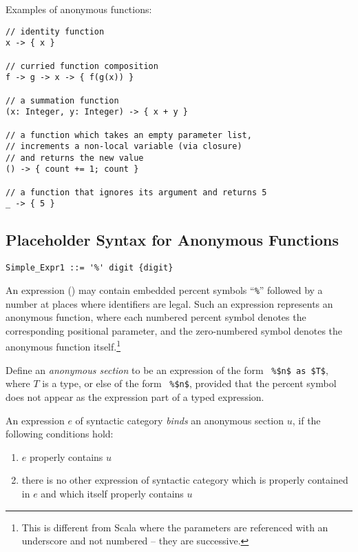 \example Examples of anonymous functions:
\begin{lstlisting}
// identity function
x -> { x }

// curried function composition
f -> g -> x -> { f(g(x)) }

// a summation function
(x: Integer, y: Integer) -> { x + y }

// a function which takes an empty parameter list,
// increments a non-local variable (via closure)
// and returns the new value
() -> { count += 1; count }

// a function that ignores its argument and returns 5
_ -> { 5 }
\end{lstlisting}





\subsection{Placeholder Syntax for Anonymous Functions}
\label{sec:placeholder-functions}

\syntax\begin{lstlisting}
Simple_Expr1 ::= '%' digit {digit}
\end{lstlisting}

An expression () may contain embedded percent symbols ``\lstinline!%!'' followed by a number at places where identifiers are legal. Such an expression represents an anonymous function, where each numbered percent symbol denotes the corresponding positional parameter, and the zero-numbered symbol denotes the anonymous function itself.\footnote{This is different from Scala where the parameters are referenced with an underscore and not numbered -- they are successive.}

Define an {\em anonymous section} to be an expression of the form ~\lstinline!%$n$ as $T$!, where $T$ is a type, or else of the form ~\lstinline!%$n$!, provided that the percent symbol does not appear as the expression part of a typed expression. 

An expression $e$ of syntactic category  {\em binds} an anonymous section $u$, if the following conditions hold:
\begin{enumerate}
  \item $e$ properly contains $u$
  \item there is no other expression of syntactic category  which is properly contained in $e$ and which itself properly contains $u$
\end{enumerate}

